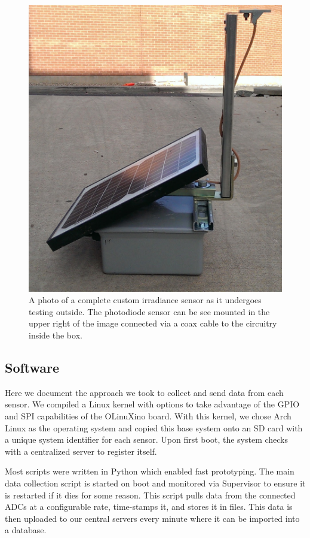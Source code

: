 \begin{figure}[p]
  \includegraphics[width=\textwidth]{figs/sensor_outside.jpg}
\caption[A complete custom sensor]{A photo of a complete custom
  irradiance sensor as it undergoes testing outside. The photodiode
  sensor can be see mounted in the upper right of the image connected
  via a coax cable to the circuitry inside the box.}
\label{fig:sensor_outside}
\end{figure}

\subsection{Software}
Here we document the approach we took to collect and send data from
each sensor.
We compiled a Linux kernel with options to take advantage of
the GPIO and SPI capabilities of the OLinuXino board.
With this kernel, we chose Arch Linux as the operating system and
copied this base system onto an SD card with a unique system
identifier for each sensor.
Upon first boot, the system checks with a centralized server to
register itself.

Most scripts were written in Python which enabled fast prototyping.
The main data collection script is started on boot and monitored via
Supervisor to ensure it is restarted if it dies for some reason.
This script pulls data from the connected ADCs at a configurable rate,
time-stamps it, and stores it in files.
This data is then uploaded to our central servers every minute where
it can be imported into a database.

